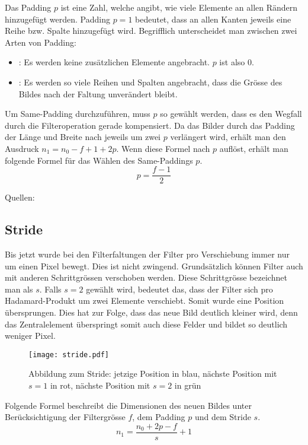 Das Padding $p$ ist eine Zahl, welche angibt, wie viele Elemente an allen Rändern
hinzugefügt werden. Padding $p = 1$ bedeutet, dass an allen Kanten jeweils eine
Reihe bzw. Spalte hinzugefügt wird.
Begrifflich unterscheidet man zwischen zwei Arten von Padding:
\begin{itemize}
\item{: Es werden keine zusätzlichen Elemente angebracht. $p$ ist also 0.}
\item{: Es werden so viele Reihen und Spalten angebracht, dass
    die Grösse des Bildes nach der Faltung unverändert bleibt.}
\end{itemize}
\para{}
Um Same-Padding durchzuführen, muss $p$ so gewählt werden, dass es den Wegfall durch
die Filteroperation gerade kompensiert. Da das Bilder durch das Padding der Länge und
Breite nach jeweils um zwei $p$ verlängert wird, erhält man den Ausdruck $n_1 =
n_0 - f + 1 + 2p$. Wenn diese Formel nach $p$ auflöst,
erhält man folgende Formel für das Wählen des Same-Paddings $p$.
\\
\begin{equation}
  p = \frac{f-1}{2}
\end{equation}

\para{}
Quellen: \cite{deeplearning.ai:cnn}

\subsection{Stride}
Bis jetzt wurde bei den Filterfaltungen der Filter pro Verschiebung immer nur
um einen Pixel bewegt. Dies ist nicht zwingend. Grundsätzlich können Filter auch
mit anderen Schrittgrössen verschoben werden.
Diese Schrittgrösse bezeichnet
man als  $s$. Falls $s = 2$ gewählt wird, bedeutet das, dass der
Filter sich pro Hadamard-Produkt um zwei Elemente verschiebt. Somit wurde eine
Position übersprungen. Dies hat zur Folge, dass das neue Bild
deutlich kleiner wird, denn das Zentralelement überspringt somit auch
diese Felder und bildet so deutlich weniger Pixel.
\para{}
\begin{figure}[h!]
  \centering
  \texttt{[image: stride.pdf]}
  \caption{Abbildung zum Stride: jetzige Position in blau, nächste Position mit
    $s=1$ in rot, nächste Position mit $s=2$ in grün}
\end{figure}
\para{}
Folgende Formel beschreibt die Dimensionen des neuen Bildes unter
Berücksichtigung der Filtergrösse $f$, dem Padding $p$ und dem Stride $s$.
\\
\begin{equation}
  n_1 = \frac{n_0 + 2p - f}{s} + 1
\end{equation}

